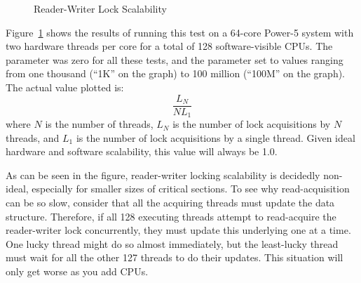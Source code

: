 \begin{figure}[tb]
\begin{center}
\end{center}
\caption{Reader-Writer Lock Scalability}
\label{fig:intro:Reader-Writer Lock Scalability}
\end{figure}

Figure~\ref{fig:intro:Reader-Writer Lock Scalability}
shows the results of running this test on a 64-core Power-5 system
with two hardware threads per core for a total of 128 software-visible
CPUs.
The  parameter was zero for all these tests, and the
 parameter set to values ranging from one thousand (``1K''
on the graph) to 100 million (``100M'' on the graph).
The actual value plotted is:
\begin{equation}
	\frac{L_N}{N L_1}
\end{equation}
where $N$ is the number of threads,
$L_N$ is the number of lock acquisitions by $N$ threads, and
$L_1$ is the number of lock acquisitions by a single thread.
Given ideal hardware and software scalability, this value will always
be 1.0.

As can be seen in the figure, reader-writer locking scalability is
decidedly non-ideal, especially for smaller sizes of critical
sections.
To see why read-acquisition can be so slow, consider
that all the acquiring threads must update the 
data structure.
Therefore, if all 128 executing threads attempt to
read-acquire the reader-writer lock concurrently, they must update
this underlying  one at a time.
One lucky thread might do so almost immediately, but the least-lucky
thread must wait for all the other 127 threads to do their updates.
This situation will only get worse as you add CPUs.

